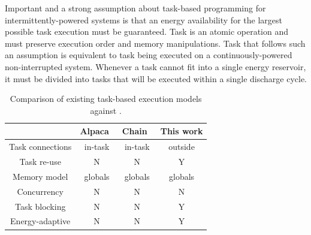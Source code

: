 Important and a strong assumption about task-based programming for intermittently-powered systems is that an energy availability for the largest possible task execution must be guaranteed. Task is an atomic operation and  must preserve execution order and memory manipulations. Task that follows such an assumption is equivalent to task being executed on a continuously-powered non-interrupted system. Whenever a task cannot fit into a single energy reservoir, it must be divided into tasks that will be executed within a single discharge cycle.

\begin{table}
	\begin{tabular}{|c|c|c|c|}
		\hline
		{~} & Alpaca~\cite{alpaca} & Chain~\cite{chain} & This work \\
		\hline\hline
		Task connections & in-task & in-task & outside \\
		Task re-use & N & N & Y\\
		Memory model & globals & globals & globals\\
		Concurrency & N & N & N \\
		Task blocking & N & N & Y \\
		Energy-adaptive & N & N & Y \\
		\hline
	\end{tabular}
	\caption{Comparison of existing task-based execution models against \sys.}
	\label{table:feature_comparison}
\end{table}



%
%



